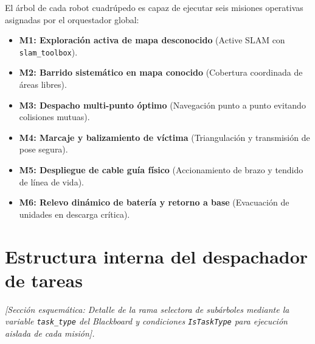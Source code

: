 El árbol de cada robot cuadrúpedo es capaz de ejecutar seis misiones operativas asignadas por el orquestador global:
\begin{itemize}
    \item \textbf{M1: Exploración activa de mapa desconocido} (Active SLAM con \texttt{slam\_toolbox}).
    \item \textbf{M2: Barrido sistemático en mapa conocido} (Cobertura coordinada de áreas libres).
    \item \textbf{M3: Despacho multi-punto óptimo} (Navegación punto a punto evitando colisiones mutuas).
    \item \textbf{M4: Marcaje y balizamiento de víctima} (Triangulación y transmisión de pose segura).
    \item \textbf{M5: Despliegue de cable guía físico} (Accionamiento de brazo y tendido de línea de vida).
    \item \textbf{M6: Relevo dinámico de batería y retorno a base} (Evacuación de unidades en descarga crítica).
\end{itemize}

\section{Estructura interna del despachador de tareas}
\label{sec:task_dispatcher}

\textit{[Sección esquemática: Detalle de la rama selectora de subárboles mediante la variable \texttt{task\_type} del Blackboard y condiciones \texttt{IsTaskType} para ejecución aislada de cada misión].}
